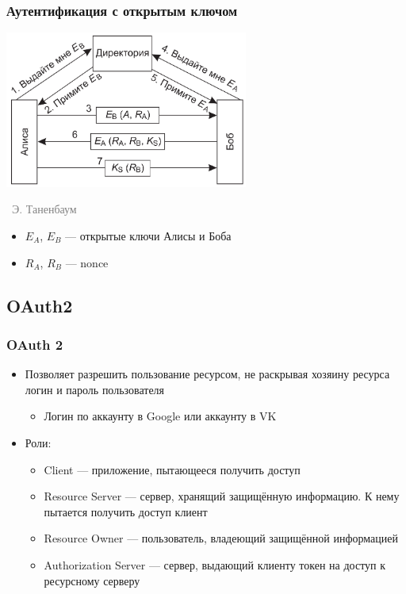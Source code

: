 \documentclass[xetex,mathserif,serif]{beamer}
\newcommand{\attribution}[1] {
\vspace{-5mm}\begin{flushright}\begin{scriptsize}\textcolor{gray}{\textcopyright\, #1}\end{scriptsize}\end{flushright}
}
\begin{document}
    \begin{frame}
        \frametitle{Аутентификация с открытым ключом}
        \begin{center}
            \includegraphics[width=0.6\textwidth]{openKeyAuthentication.png}
            \attribution{Э. Таненбаум}
        \end{center}
        \begin{itemize}
            \item $E_A$, $E_B$ --- открытые ключи Алисы и Боба
            \item $R_A$, $R_B$ --- nonce
        \end{itemize}
    \end{frame}

    \subsection{OAuth2}

    \begin{frame}
        \frametitle{OAuth 2}
        \begin{itemize}
            \item Позволяет разрешить пользование ресурсом, не раскрывая хозяину ресурса логин и пароль пользователя
            \begin{itemize}
                \item Логин по аккаунту в Google или аккаунту в VK
            \end{itemize}
            \item Роли:
            \begin{itemize}
                \item Client --- приложение, пытающееся получить доступ
                \item Resource Server --- сервер, хранящий защищённую информацию. К нему пытается получить доступ клиент
                \item Resource Owner --- пользователь, владеющий защищённой информацией
                \item Authorization Server --- сервер, выдающий клиенту токен на доступ к ресурсному серверу
            \end{itemize}
        \end{itemize}
    \end{frame}
\end{document}
